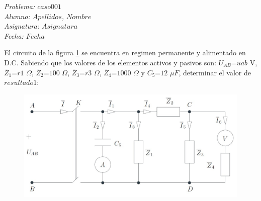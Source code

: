 \documentclass[12pt]{article}
\begin{document}
\pagestyle{empty}
\begin{center}
   \textit{\huge{Problema: $caso001$\\}}
	 \textit{\Large{Alumno: $Apellidos$, $Nombre$ \\}}
	 \textit{\Large{Asignatura: $Asignatura$\\}}
	 \textit{\Large{Fecha: $Fecha$\\}}	
	 \vskip 1mm
\end{center}

\vskip 4mm

El circuito de la figura \ref{fig_circuits_1} se encuentra en regimen permanente y alimentado en D.C. Sabiendo que los valores de los elementos activos y pasivos son: $U_{AB}$=$uab$ V, $\overline{Z}_{1}$=$r1$ $\Omega$, $\overline{Z}_{2}$=$100$ $\Omega$, $\overline{Z}_{3}$=$r3$ $\Omega$, $\overline{Z}_{4}$=$1000$ $\Omega$ y $C_{5}$=$12$ $\mu F$, determinar el valor de $resultado1$:
\vskip 4mm

\begin{figure}[h!]
\centering
\includegraphics[width=12cm]{./caso001.png}
\caption{}\label{fig_circuits_1}
\end{figure}
\end{document}

